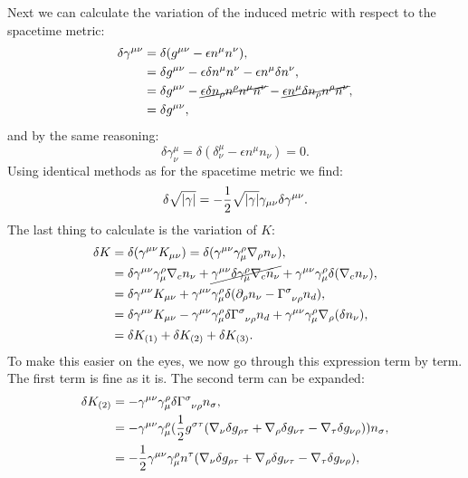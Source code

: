 Next we can calculate the variation of the induced metric with respect to the spacetime metric:
\begin{equation*}
	\begin{aligned}
		\delta \gamma^{\mu \nu} &= \delta (g^{\mu \nu} - \epsilon n^\mu n^\nu), \\
		&= \delta g^{\mu \nu} - \epsilon \delta n^\mu n^\nu - \epsilon n^\mu \delta n^\nu ,\\
		&= \delta g^{\mu \nu} - \cancel{\epsilon \delta n_\rho n^\rho n^\mu n^\nu} - \cancel{\epsilon n^\mu \delta n_\rho n^\rho n^\nu},	\\	&= \delta g^{\mu \nu} ,
	\end{aligned}
\end{equation*}
and by the same reasoning:
\begin{equation*}
	\delta \gamma^{\mu}_\nu = \delta (\delta^\mu_\nu - \epsilon n^\mu n_\nu) = 0.
\end{equation*}
Using identical methods as for the spacetime metric we find:
\begin{equation*}
	\delta \sqrt{|\gamma|} = -\frac{1}{2} \sqrt{|\gamma|} \gamma_{\mu \nu} \delta \gamma^{\mu \nu}.
\end{equation*}
The last thing to calculate is the variation of $K$:
\begin{equation*}
	\begin{aligned}
		\delta K &= \delta (\gamma^{\mu \nu} K_{\mu \nu}) = \delta (\gamma^{\mu \nu} \gamma^\rho_\mu \nabla_\rho n_\nu), \\
		&= \delta \gamma^{\mu \nu} \gamma^\rho_\mu \nabla_{c} n_\nu +  \cancel{\gamma^{\mu \nu} \delta \gamma^\rho_\mu \nabla_{c} n_\nu} +  \gamma^{\mu \nu} \gamma^\rho_\mu \delta(\nabla_{c} n_\nu), \\
		&= \delta \gamma^{\mu \nu} K_{\mu \nu} + \gamma^{\mu \nu} \gamma^\rho_\mu \delta(\partial_\rho n_\nu - \tensor{\Gamma}{^\sigma_{\nu \rho}} n_d) ,\\
		&= \delta \gamma^{\mu \nu} K_{\mu \nu} - \gamma^{\mu \nu} \gamma^\rho_\mu \delta \tensor{\Gamma}{^\sigma_{\nu \rho}} n_d + \gamma^{\mu \nu} \gamma^\rho_\mu \nabla_\rho (\delta n_\nu), \\
		&= \delta K_{(1)} + \delta K_{(2)} + \delta K_{(3)}.
	\end{aligned}
\end{equation*}
To make this easier on the eyes, we now go through this expression term by term. The first term is fine as it is. The second term can be expanded:
\begin{equation*}
\begin{aligned}
		\delta K_{(2)} &= -\gamma^{\mu \nu} \gamma^\rho_\mu \delta \tensor{\Gamma}{^\sigma_{\nu \rho}} n_\sigma ,\\
		&= -\gamma^{\mu \nu} \gamma^\rho_\mu(\half g^{\sigma \tau} (\nabla_\nu \delta g_{\rho \tau} + \nabla_\rho \delta g_{\nu \tau} - \nabla_\tau \delta g_{\nu \rho}))n_\sigma, \\
		&= -\half \gamma^{\mu \nu} \gamma^\rho_\mu n^\tau (\nabla_\nu \delta g_{\rho \tau} + \nabla_\rho \delta g_{\nu \tau} - \nabla_\tau \delta g_{\nu \rho}),
\end{aligned}
\end{equation*}
